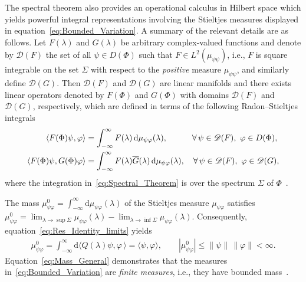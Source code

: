 \documentclass[leqno,onefignum,onetabnum]{siamltex1213}
\renewcommand{\d}{\mathrm{d}}
\newcommand{\Ds}{\mathscr{D}}
\begin{document}
The spectral theorem also provides an operational calculus in Hilbert
space which yields powerful integral representations involving the
Stieltjes measures displayed in
equation~\eqref{eq:Bounded_Variation}. A summary of the relevant
details are as   
follows. Let $F(\lambda)$ and $G(\lambda)$ be arbitrary complex-valued functions
and denote by $\Ds(F)$ the set of all $\psi\in D(\Phi)$ such that
$F\in L^2(\mu_{\psi\psi})$, i.e., $F$ is square integrable on the set
$\Sigma$ with respect to the \emph{positive} measure $\mu_{\psi\psi}$, and similarly define
$\Ds(G)$. Then $\Ds(F)$ and $\Ds(G)$ are linear manifolds and there
exists linear operators denoted by $F(\Phi)$ and $G(\Phi)$ with domains
$\Ds(F)$ and $\Ds(G)$, respectively, which are defined in terms of the
following Radon--Stieltjes integrals~\cite{Stone:64}  
%
\begin{align}\label{eq:Spectral_Theorem}
  \langle F(\Phi)\psi,\varphi\rangle&=\int_{-\infty}^\infty F(\lambda)\,\d\mu_{\psi\varphi}(\lambda), \qquad
  \hspace{1em}
  \forall \, \psi\in\mathscr{D}(F), \ \varphi\in D(\Phi),  
  \\
  \langle F(\Phi)\psi,G(\Phi)\varphi\rangle&=\int_{-\infty}^\infty F(\lambda)\overline{G}(\lambda)\,\d\mu_{\psi\varphi}(\lambda),
  \quad
  \forall \, \psi\in\mathscr{D}(F), \ \varphi\in\mathscr{D}(G),
  \notag
\end{align}
%
where the integration in~\eqref{eq:Spectral_Theorem} is over the
spectrum $\Sigma$ of $\Phi$~\cite{Reed-1980,Stone:64}.



The mass $\mu^0_{\psi\varphi}=\int_{-\infty}^\infty\d\mu_{\psi\varphi}(\lambda)$ of the
Stieltjes measure $\mu_{\psi\varphi}$ satisfies~\cite{Stone:64}
$\mu^0_{\psi\varphi}=\lim_{\lambda\to\sup\Sigma}\mu_{\psi\varphi}(\lambda)-\lim_{\lambda\to\inf\Sigma}\mu_{\psi\varphi}(\lambda)$. Consequently,
equation~\eqref{eq:Res_Identity_limits} yields
% 
\begin{align}\label{eq:Mass_General}
  \mu^0_{\psi\varphi}=\int_{-\infty}^\infty\d\langle Q(\lambda)\psi,\varphi\,\rangle=\langle\psi,\varphi\rangle,
  \qquad
  |\mu^0_{\psi\varphi}|\leq\|\psi\|\,\|\varphi\|<\infty.
\end{align}
%
Equation~\eqref{eq:Mass_General} demonstrates that the measures
in~\eqref{eq:Bounded_Variation} are \emph{finite measures}, i.e., they
have bounded mass~\cite{Stone:64}.
\end{document}
